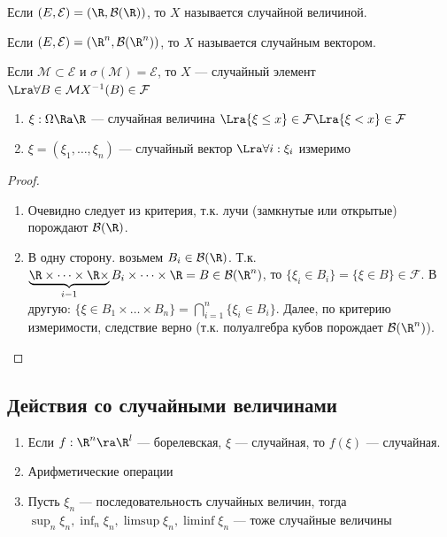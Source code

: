 \begin{definition}
    Если \((E, \mathcal{E}) = (\R, \mathcal{B}(\R))\), то \(X\) называется случайной величиной.
\end{definition}

\begin{definition}
    Если \((E, \mathcal{E}) = (\R^n, \mathcal{B}(\R^n))\), то \(X\) называется случайным вектором.
\end{definition}

\begin{reminder}
    Если \(\mathcal{M} \subset \mathcal{E}\) и \(\sigma(\mathcal{M}) = \mathcal{E}\), то \(X\) --- случайный элемент \(\Lra \forall B \in \mathcal{M} X^{-1}(B) \in \mathcal{F}\)
\end{reminder}

\begin{corollary}
    \begin{enumerate}
        \item \(\xi: \Omega \Ra \R\) --- случайная величина \(\Lra \{\xi \le x\} \in \mathcal{F} \Lra \{\xi < x\} \in \mathcal{F}\)
        \item \(\xi = (\xi_1, \dots, \xi_n)\) --- случайный вектор \(\Lra \forall i: \xi_i\) измеримо
    \end{enumerate}
\end{corollary}
\begin{proof}
    \begin{enumerate}
        \item Очевидно следует из критерия, т.к. лучи (замкнутые или открытые) порождают \(\mathcal{B}(\R)\).
        \item В одну сторону. возьмем \(B_i \in \mathcal{B}(\R)\). Т.к. \(\underbrace{\R \times \dots \times \R \times}_{i - 1}B_i \times \dots \times \R= B \in \mathcal{B}(\R^n)\), то \(\{\xi_i \in B_i\} = \{\xi \in B\} \in \mathcal{F}\). В другую: \(\{\xi \in B_1 \times \dots \times B_n\} = \bigcap_{i = 1}^n\{\xi_i \in B_i\}\). Далее, по критерию измеримости, следствие верно (т.к. полуалгебра кубов порождает \(\mathcal{B}(\R^n)\)).
    \end{enumerate}
\end{proof}

\subsection{Действия со случайными величинами}
\begin{enumerate}
    \item Если \(f: \R^n \ra \R^l\) --- борелевская, \(\xi\) --- случайная, то \(f(\xi)\) --- случайная.
    \item Арифметические операции
    \item Пусть \(\xi_n\) --- последовательность случайных величин, тогда \(\sup_n \xi_n, \inf_n \xi_n, \limsup \xi_n, \liminf \xi_n\) --- тоже случайные величины
\end{enumerate}

